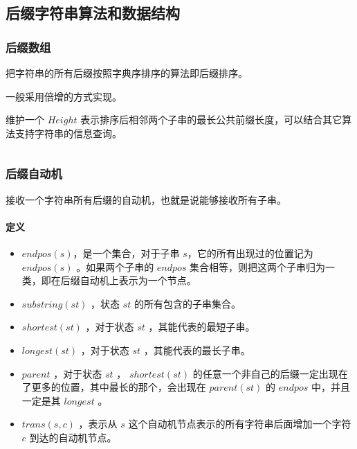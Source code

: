 \documentclass[UTF-8]{ctexart}
\newcommand{\cpp}[1]{\inputminted[bgcolor=bg,breaklines,breakanywhere=true]{c++}{#1}}
\begin{document}
		\subsection{后缀字符串算法和数据结构}
			\subsubsection{后缀数组}
			把字符串的所有后缀按照字典序排序的算法即后缀排序。
			
			一般采用倍增的方式实现。
			
			维护一个 $Height$ 表示排序后相邻两个子串的最长公共前缀长度，可以结合其它算法支持字符串的信息查询。
			\cpp{code//String//sa.cpp}
			\subsubsection{后缀自动机}
			接收一个字符串所有后缀的自动机，也就是说能够接收所有子串。
			\paragraph{定义}
			\begin{itemize}
				\item $endpos(s)$，是一个集合，对于子串 $s$，它的所有出现过的位置记为 $endpos(s)$ 。如果两个子串的 $endpos$ 集合相等，则把这两个子串归为一类，即在后缀自动机上表示为一个节点。  
				\item  $substring(st)$ ，状态 $st$ 的所有包含的子串集合。
				\item  $shortest(st)$ ，对于状态 $st$ ，其能代表的最短子串。  
				\item  $longest(st)$ ，对于状态 $st$ ，其能代表的最长子串。  
				\item  $parent$ ，对于状态 $st$ ， $shortest(st)$ 的任意一个非自己的后缀一定出现在了更多的位置，其中最长的那个，会出现在 $parent(st)$ 的 $endpos$ 中，并且一定是其 $longest$ 。
				\item  $trans(s,c)$ ，表示从 $s$ 这个自动机节点表示的所有字符串后面增加一个字符 $c$ 到达的自动机节点。
			\end{itemize}
\end{document}
